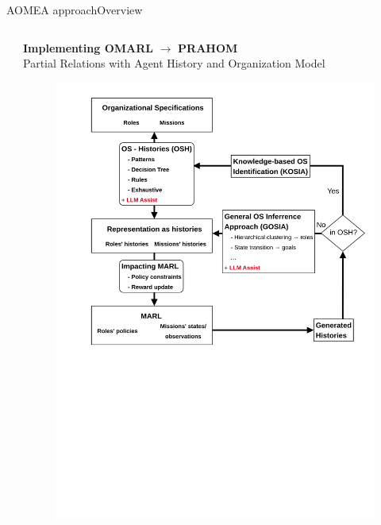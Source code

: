 \begin{frame}{AOMEA approach}{Overview}
\begin{columns}
\begin{column}{0.5\textwidth}
        \end{column}

        \hspace{-5ex}
        \begin{column}{0.5\textwidth}
            {\small \textbf{Implementing OMARL} $\rightarrow$ \textbf{PRAHOM} \\ { \footnotesize Partial Relations with Agent History and Organization Model}}

            \centering
            \begin{figure}
                \vspace{-4ex}
                \includegraphics[width=1.1\linewidth]{figures/prahom_overview.png}
            \end{figure}

        \end{column}

    \end{columns}

\end{frame}


